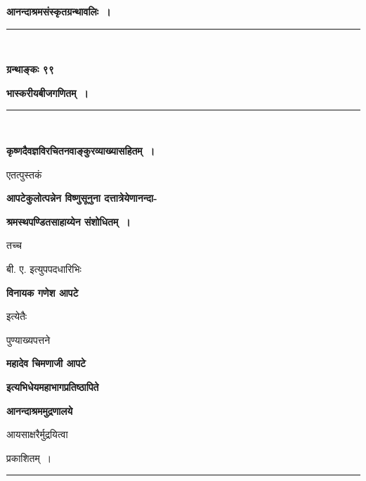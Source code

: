 \documentclass[11pt, openany]{book}
\begin{document}
\thispagestyle{empty}

\begin{center}
{\LARGE \textbf{आनन्दाश्रमसंस्कृतग्रन्थावलिः~।} }\\
\vspace{-1mm}
\rule{0.5\linewidth}{0.5pt}\\
\vspace{2mm}

{\large \textbf{ग्रन्थाङ्कः ९९}}
\vspace{2mm}

\textbf{\huge भास्करीयबीजगणितम्~।}\\
\vspace{-1mm}
\rule{0.3\linewidth}{0.7pt}\\
\vspace{2mm}

{\large \textbf{कृष्णदैवज्ञविरचितनवाङ्कुरव्याख्यासहितम्~। }}
\vspace{2mm}

एतत्पुस्तकं
\vspace{2mm}

{\large \textbf{आपटेकुलोत्पन्नेन विष्णुसूनुना दत्तात्रेयेणानन्दा-}}
\vspace{2mm}

{\large \textbf{श्रमस्थपण्डितसाहाय्येन संशोधितम्~।}}
\vspace{2mm}

तच्च
\vspace{2mm}

बी. ए. इत्युपपदधारिभिः
\vspace{2mm}

{\Large \textbf{विनायक गणेश आपटे}}
\vspace{2mm}

इत्येतैः
\vspace{2mm}

पुण्याख्यपत्तने
\vspace{2mm}

{\large \textbf{महादेव चिमणाजी आपटे}}
\vspace{2mm}

\textbf{इत्यभिधेयमहाभागप्रतिष्ठापिते}
\vspace{2mm}

{\LARGE \textbf{आनन्दाश्रममुद्रणालये}}
\vspace{2mm}

आयसाक्षरैर्मुद्रयित्वा
\vspace{2mm}

प्रकाशितम्~।\\
\vspace{-2mm}
\rule{0.1\linewidth}{0.5pt}\\
\vspace{2mm}


\end{center}
\end{document}

